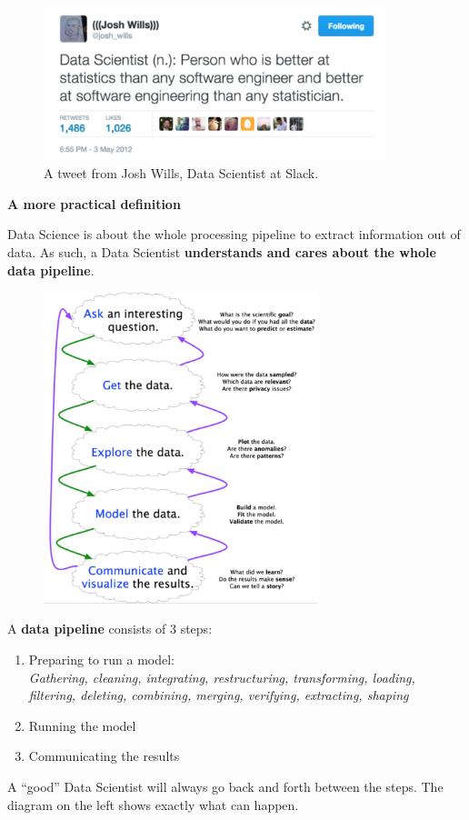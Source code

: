 \begin{figure}[H]
 \centering
 \includegraphics[width=10cm]{./img/01/tweet_wills.png}
 \caption{\label{img:tweet_wills} A tweet from Josh Wills, Data Scientist at Slack.}
\end{figure}

{\bf A more practical definition} 

Data Science is about the whole processing pipeline to extract information out of data. As such, a Data Scientist {\bf understands and cares about the whole data pipeline}.

\begin{minipage}{0.5\textwidth}
\begin{figure}[H]
 \centering
 \includegraphics[width=8cm]{./img/01/pipeline.png}
\end{figure}
\end{minipage} \hfill
\begin{minipage}{0.45\textwidth}
A {\bf data pipeline} consists of 3 steps:
\begin{enumerate}
 \item Preparing to run a model: \\
  {\it Gathering, cleaning, integrating, restructuring, transforming, loading, filtering, deleting, combining, merging, verifying, extracting, shaping}
 \item Running the model
 \item Communicating the results
\end{enumerate}
\vspace{0.5cm}
 A ``good'' Data Scientist will always go back and forth between the steps. The diagram on the left shows exactly what can happen. 
\end{minipage}
